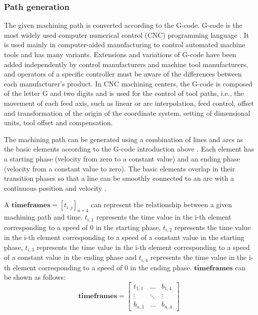 \subsubsection{Path generation} \label{subsubsec:subsec:sec:scheme:process:path: path generation}
The given machining path is converted according to the G-code. G-code is the most widely used computer numerical control (CNC) programming language \cite{cncs}. It is used mainly in computer-aided manufacturing to control automated machine tools and has many variants. Extensions and variations of G-code have been added independently by control manufacturers and machine tool manufacturers, and operators of a specific controller must be aware of the differences between each manufacturer's product. In CNC machining centers, the G-code is composed of the letter G and two digits and is used for the control of tool paths, i.e., the movement of each feed axis, such as linear or arc interpolation, feed control, offset and transformation of the origin of the coordinate system, setting of dimensional units, tool offset and compensation. \par
The machining path can be generated using a combination of lines and arcs as the basic elements according to the G-code introduction above \cite{dqt}. Each element has a starting phase (velocity from zero to a constant value) and an ending phase (velocity from a constant value to zero). The basic elements overlap in their transition phases so that a line can be smoothly connected to an arc with a continuous position and velocity \cite{dqt}. \par
A $\boldsymbol{timeframes} = \left[t_{i,j}\right]_{n \times 4}$ can represent the relationship between a given machining path and time. $t_{i,1}$ represents the time value in the i-th element corresponding to a speed of 0 in the starting phase, $t_{i,2}$ represents the time value in the i-th element corresponding to a speed of a constant value in the starting phase, $t_{i,3}$ represents the time value in the i-th element corresponding to a speed of a constant value in the ending phase and $t_{i,4}$ represents the time value in the i-th element corresponding to a speed of 0 in the ending phase. $\boldsymbol{timeframes}$ can be shown as follows:
\begin{equation}
\boldsymbol{timeframes} = \begin{bmatrix} 
    t_{1,1} & \dots  & b_{1,4}\\
    \vdots & \ddots & \vdots\\
    b_{n,1} & \dots  & b_{n,4} 
    \end{bmatrix}
    \label{eq:tframe}
\end{equation}
